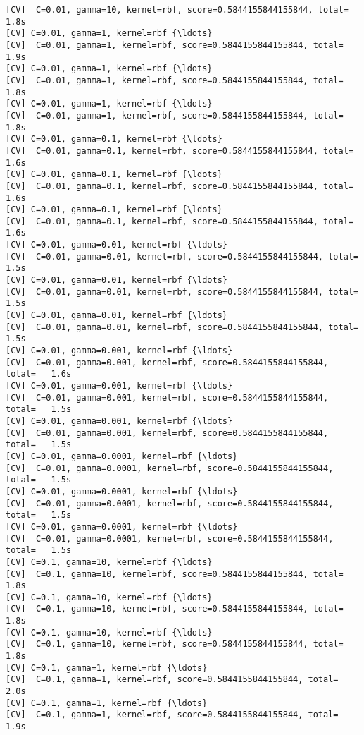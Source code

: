 \documentclass[11pt]{article}
\begin{document}
    \begin{Verbatim}[commandchars=\\\{\}]
[CV]  C=0.01, gamma=10, kernel=rbf, score=0.5844155844155844, total=   1.8s
[CV] C=0.01, gamma=1, kernel=rbf {\ldots}
[CV]  C=0.01, gamma=1, kernel=rbf, score=0.5844155844155844, total=   1.9s
[CV] C=0.01, gamma=1, kernel=rbf {\ldots}
[CV]  C=0.01, gamma=1, kernel=rbf, score=0.5844155844155844, total=   1.8s
[CV] C=0.01, gamma=1, kernel=rbf {\ldots}
[CV]  C=0.01, gamma=1, kernel=rbf, score=0.5844155844155844, total=   1.8s
[CV] C=0.01, gamma=0.1, kernel=rbf {\ldots}
[CV]  C=0.01, gamma=0.1, kernel=rbf, score=0.5844155844155844, total=   1.6s
[CV] C=0.01, gamma=0.1, kernel=rbf {\ldots}
[CV]  C=0.01, gamma=0.1, kernel=rbf, score=0.5844155844155844, total=   1.6s
[CV] C=0.01, gamma=0.1, kernel=rbf {\ldots}
[CV]  C=0.01, gamma=0.1, kernel=rbf, score=0.5844155844155844, total=   1.6s
[CV] C=0.01, gamma=0.01, kernel=rbf {\ldots}
[CV]  C=0.01, gamma=0.01, kernel=rbf, score=0.5844155844155844, total=   1.5s
[CV] C=0.01, gamma=0.01, kernel=rbf {\ldots}
[CV]  C=0.01, gamma=0.01, kernel=rbf, score=0.5844155844155844, total=   1.5s
[CV] C=0.01, gamma=0.01, kernel=rbf {\ldots}
[CV]  C=0.01, gamma=0.01, kernel=rbf, score=0.5844155844155844, total=   1.5s
[CV] C=0.01, gamma=0.001, kernel=rbf {\ldots}
[CV]  C=0.01, gamma=0.001, kernel=rbf, score=0.5844155844155844, total=   1.6s
[CV] C=0.01, gamma=0.001, kernel=rbf {\ldots}
[CV]  C=0.01, gamma=0.001, kernel=rbf, score=0.5844155844155844, total=   1.5s
[CV] C=0.01, gamma=0.001, kernel=rbf {\ldots}
[CV]  C=0.01, gamma=0.001, kernel=rbf, score=0.5844155844155844, total=   1.5s
[CV] C=0.01, gamma=0.0001, kernel=rbf {\ldots}
[CV]  C=0.01, gamma=0.0001, kernel=rbf, score=0.5844155844155844, total=   1.5s
[CV] C=0.01, gamma=0.0001, kernel=rbf {\ldots}
[CV]  C=0.01, gamma=0.0001, kernel=rbf, score=0.5844155844155844, total=   1.5s
[CV] C=0.01, gamma=0.0001, kernel=rbf {\ldots}
[CV]  C=0.01, gamma=0.0001, kernel=rbf, score=0.5844155844155844, total=   1.5s
[CV] C=0.1, gamma=10, kernel=rbf {\ldots}
[CV]  C=0.1, gamma=10, kernel=rbf, score=0.5844155844155844, total=   1.8s
[CV] C=0.1, gamma=10, kernel=rbf {\ldots}
[CV]  C=0.1, gamma=10, kernel=rbf, score=0.5844155844155844, total=   1.8s
[CV] C=0.1, gamma=10, kernel=rbf {\ldots}
[CV]  C=0.1, gamma=10, kernel=rbf, score=0.5844155844155844, total=   1.8s
[CV] C=0.1, gamma=1, kernel=rbf {\ldots}
[CV]  C=0.1, gamma=1, kernel=rbf, score=0.5844155844155844, total=   2.0s
[CV] C=0.1, gamma=1, kernel=rbf {\ldots}
[CV]  C=0.1, gamma=1, kernel=rbf, score=0.5844155844155844, total=   1.9s

\end{Verbatim}
\end{document}
